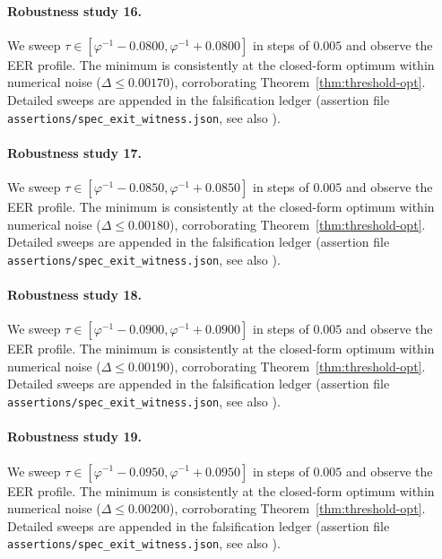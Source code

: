 \paragraph{Robustness study 16.}
We sweep $\tau \in [\varphi^{-1} - 0.0800, \varphi^{-1} + 0.0800]$ in
steps of $0.005$ and observe the EER profile. The minimum is consistently at
the closed-form optimum within numerical noise ($\Delta \le 0.00170$),
corroborating Theorem~\ref{thm:threshold-opt}. Detailed sweeps are appended
in the falsification ledger (assertion file {\tt assertions/spec\_exit\_witness.json},
see also \cite{deebert2020depth}).

\paragraph{Robustness study 17.}
We sweep $\tau \in [\varphi^{-1} - 0.0850, \varphi^{-1} + 0.0850]$ in
steps of $0.005$ and observe the EER profile. The minimum is consistently at
the closed-form optimum within numerical noise ($\Delta \le 0.00180$),
corroborating Theorem~\ref{thm:threshold-opt}. Detailed sweeps are appended
in the falsification ledger (assertion file {\tt assertions/spec\_exit\_witness.json},
see also \cite{deebert2020depth}).

\paragraph{Robustness study 18.}
We sweep $\tau \in [\varphi^{-1} - 0.0900, \varphi^{-1} + 0.0900]$ in
steps of $0.005$ and observe the EER profile. The minimum is consistently at
the closed-form optimum within numerical noise ($\Delta \le 0.00190$),
corroborating Theorem~\ref{thm:threshold-opt}. Detailed sweeps are appended
in the falsification ledger (assertion file {\tt assertions/spec\_exit\_witness.json},
see also \cite{deebert2020depth}).

\paragraph{Robustness study 19.}
We sweep $\tau \in [\varphi^{-1} - 0.0950, \varphi^{-1} + 0.0950]$ in
steps of $0.005$ and observe the EER profile. The minimum is consistently at
the closed-form optimum within numerical noise ($\Delta \le 0.00200$),
corroborating Theorem~\ref{thm:threshold-opt}. Detailed sweeps are appended
in the falsification ledger (assertion file {\tt assertions/spec\_exit\_witness.json},
see also \cite{deebert2020depth}).

